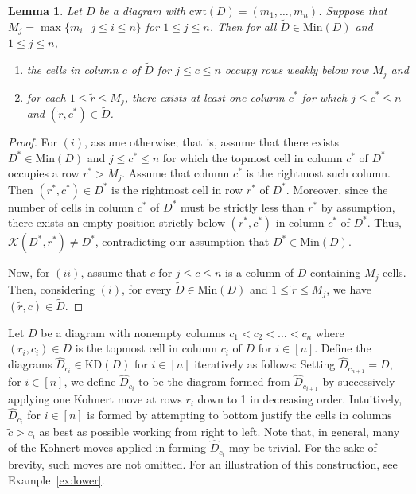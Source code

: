 \documentclass[letterpaper,10pt]{article}
\newtheorem{lemma}[theorem]{Lemma}
\begin{document}
\begin{lemma}\label{lem:minprophelp}
    Let $D$ be a diagram with $\mathrm{cwt}(D)=(m_1,\hdots,m_n)$. Suppose that $M_j=\max\{m_i~|~j\le i\le n\}$ for $1\le j\le n$. Then for all $\tilde{D}\in\mathrm{Min}(D)$ and $1\le j\le n$,
    \begin{enumerate}
        \item[$(i)$] the cells in column $c$ of $\tilde{D}$ for $j\le c\le n$ occupy rows weakly below row $M_j$ and
        \item[$(ii)$] for each $1 \le \tilde{r} \le M_j$, there exists at least one column $c^*$ for which $j\le c^*\le n$ and $(\tilde{r},c^*)\in \tilde{D}$.
    \end{enumerate}
\end{lemma}
\begin{proof}
    For $(i)$, assume otherwise; that is, assume that there exists $D^*\in\mathrm{Min}(D)$ and $j\le c^*\le n$ for which the topmost cell in column $c^*$ of $D^*$ occupies a row $r^*>M_j$. Assume that column $c^*$ is the rightmost such column. Then $(r^*,c^*)\in D^*$ is the rightmost cell in row $r^*$ of $D^*$. Moreover, since the number of cells in column $c^*$ of $D^*$ must be strictly less than $r^*$ by assumption, there exists an empty position strictly below $(r^*,c^*)$ in column $c^*$ of $D^*$. Thus, $\mathcal{K}(D^*,r^*)\neq D^*$, contradicting our assumption that $D^*\in\mathrm{Min}(D)$.

    Now, for $(ii)$, assume that $c$ for $j\le c\le n$ is a column of $D$ containing $M_j$ cells. Then, considering $(i)$, for every $\tilde{D}\in \mathrm{Min}(D)$ and $1 \le \tilde{r} \le M_j$, we have $(\tilde{r},c)\in \tilde{D}$.
\end{proof}

Let $D$ be a diagram with nonempty columns $c_1<c_2<\hdots<c_n$ where $(r_i,c_i)\in D$ is the topmost cell in column $c_i$ of $D$ for $i\in[n]$. Define the diagrams $\widehat{D}_{c_i}\in \mathrm{KD}(D)$ for $i\in [n]$ iteratively as follows: Setting $\widehat{D}_{c_{n+1}}=D$, for $i\in [n]$, we define $\widehat{D}_{c_i}$ to be the diagram formed from $\widehat{D}_{c_{i+1}}$ by successively applying one Kohnert move at rows $r_i$ down to 1 in decreasing order. Intuitively, $\widehat{D}_{c_i}$ for $i\in [n]$ is formed by attempting to bottom justify the cells in columns $\tilde{c}>c_i$ as best as possible working from right to left. Note that, in general, many of the Kohnert moves applied in forming $\widehat{D}_{c_i}$ may be trivial. For the sake of brevity, such moves are not omitted. For an illustration of this construction, see Example~\ref{ex:lower}.
\end{document}
